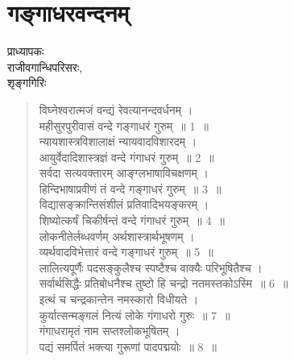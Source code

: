 {\fontsize{15}{17}\selectfont
\presetvalues
{}
\chapter{गङ्गाधरवन्दनम्}

\begin{center}
\smallskip

प्राध्यापकः\\
राजीवगान्धिपरिसरः,\\
शृङ्गगिरिः
\addrule
\end{center}

\begin{verse}
विघ्नेश्वरात्मजं वन्द्यं  रेवत्यानन्दवर्धनम् ।\\
महीसुरपुरीवासं वन्दे गङ्गाधरं गुरुम्~॥ 1~॥\\
न्यायशास्त्रविशालाक्षं न्यायवादविशारदम् ।\\
आयुर्वेदादिशास्त्रज्ञं वन्दे गंगाधरं गुरुम्~॥ 2~॥\\
सर्वदा सत्यवक्तारम् आङ्ग्लभाषाविचक्षणम् ।\\
हिन्दिभाषाप्रवीणं तं वन्दे गङ्गाधरं गुरुम्~॥ 3~॥\\
विद्यासङ्क्रान्तिसंशीलं प्रतिवादिभयङ्करम् ।\\
शिष्योत्कर्षं चिकीर्षन्तं वन्दे गंगाधरं गुरुम्~॥ 4~॥\\
लोकनीतेर्लब्धवर्णम् अर्थशास्त्रार्थभूषणम् ।\\
व्यर्थवादविभेत्तारं वन्दे गङ्गाधरं गुरुम्~॥ 5~॥\\
लालित्यपूर्णैः पदसङ्कुलैश्च स्पष्टैश्च वाक्यैः परिभूषितैश्च ।\\
सर्वार्थसिद्धैः प्रतिबोधनैश्च तुष्टो हि चन्द्रो नतमस्तकोऽस्मि~॥ 6~॥\\
इत्थं च चन्द्रकान्तेन नमस्कारो विधीयते ।\\
कुर्यात्सन्मङ्गलं नित्यं लोके गंगाधरो गुरुः~॥ 7~॥\\
गंगाधरामृतं नाम सप्तश्लोकभूषितम्  ।\\
पद्यं समर्पितं भक्त्या गुरूणां पादपद्मयोः~॥ 8~॥
\end{verse}

\articleend
}
